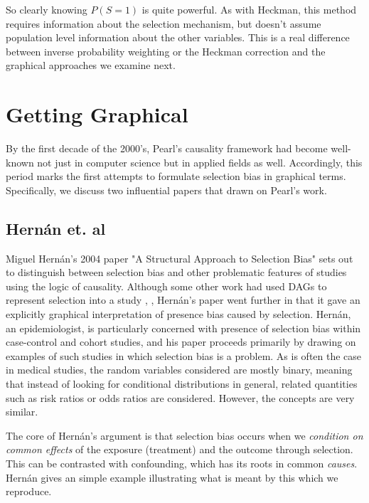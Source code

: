 \documentclass[12pt,twoside]{reedthesis}
\theoremstyle{definition}
\begin{document}
So clearly knowing $P(S = 1)$ is quite powerful. As with Heckman, this method requires information about the selection mechanism, but doesn't assume population level information about the other variables. This is a real difference between inverse probability weighting or the Heckman correction and the graphical approaches we examine next.

\section{Getting Graphical}


By the first decade of the 2000's, Pearl's causality framework had become well-known not just in computer science but in applied fields as well. Accordingly, this period marks the first attempts to formulate selection bias in graphical terms. Specifically, we discuss two influential papers that drawn on Pearl's work.

\subsection{Hern\'an et. al}

Miguel Hern\'an's 2004 paper "A Structural Approach to Selection Bias" sets out to distinguish between selection bias and other problematic features of studies using the logic of causality. Although some other work had used DAGs to represent selection into a study \citep{Robbins_2001}, \citep{Pearl_1995}, Hern\'an's paper went further in that it gave an explicitly graphical interpretation of presence bias caused by selection. Hern\'an, an epidemiologist, is particularly concerned with presence of selection bias within case-control and cohort studies, and his paper proceeds primarily by drawing on examples of such studies in which selection bias is a problem. As is often the case in medical studies, the random variables considered are mostly binary, meaning that instead of looking for conditional distributions in general, related quantities such as risk ratios or odds ratios are considered. However, the concepts are very similar.

The core of Hern\'an's argument is that selection bias occurs when we \emph{condition on common effects} of the exposure (treatment) and the outcome through selection. This can be contrasted with confounding, which has its roots in common \emph{causes}. Hern\'an gives an simple example illustrating what is meant by this which we reproduce.
\end{document}
